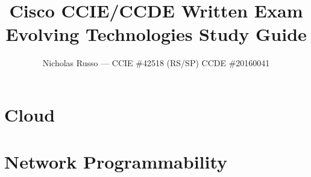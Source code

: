 \documentclass{article}
\title{\Huge Cisco CCIE/CCDE Written Exam Evolving Technologies Study Guide}
\author{\Large Nicholas Russo --- CCIE \#42518 (RS/SP) CCDE \#20160041}
\begin{document}
\newcommand{\addimgnocaption}[2]{
  \begin{minipage}[t]{\linewidth}
  \centering
  \texttt{[image: \\imgpath\#1]}
  \end{minipage}
}

\newcommand{\addimg}[3]{
  \begin{minipage}[t]{\linewidth}
  \centering
  \captionsetup{type=figure}
  \texttt{[image: \\imgpath\#1]}
  \captionof{figure}{#3}
  \end{minipage}
}
\maketitle

\newpage
\begin{abstract}
\setlength\parindent{0pt}
\setlength{\parskip}{0.5cm}
\newcommand{\imgpath}{content/misc/img/}

\end{abstract}

\newpage
\tableofcontents
\listoffigures
\listoftables

\newpage
\section{Cloud}
\newcommand{\imgpath}{content/cloud/a1a-design/img/}






\renewcommand{\imgpath}{content/cloud/a1b-infra/img/}






\newpage
\section{Network Programmability}
\renewcommand{\imgpath}{content/netprog/a2a-archops/img/}





\end{document}
